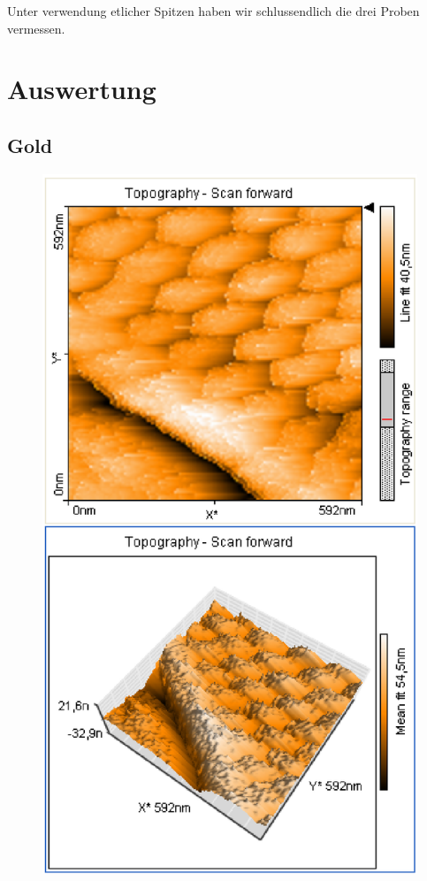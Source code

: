 \documentclass[12pt]{article}
\begin{document}
Unter verwendung etlicher Spitzen haben wir schlussendlich die drei Proben vermessen.
\section{Auswertung}
\subsection{Gold}
\begin{figure}[H]  
\begin{minipage}{0.4\linewidth}
\centering
\includegraphics[width=0.9\linewidth]{../plot/data/goldgitter/goldgitter.eps}

\end{minipage}
\end{figure}
\end{document}
